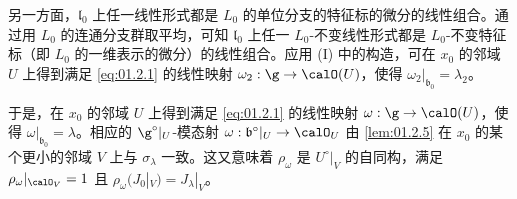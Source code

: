 另一方面，$\mathfrak{l}_0$ 上任一线性形式都是 $L_0$ 的单位分支的特征标的微分的线性组合。通过用 $L_0$ 的连通分支群取平均，可知 $\mathfrak{l}_0$ 上任一 $L_0$-不变线性形式都是 $L_0$-不变特征标（即 $L_0$ 的一维表示的微分）的线性组合。应用 (I) 中的构造，可在 $x_0$ 的邻域 $U$ 上得到满足 \eqref{eq:01.2.1} 的线性映射 $\omega_2:\g\to\calO(U)$，使得 $\omega_2|_{\mathfrak{b}_0}=\lambda_2$。

于是，在 $x_0$ 的邻域 $U$ 上得到满足 \eqref{eq:01.2.1} 的线性映射 $\omega:\g\to\calO(U)$，使得 $\omega|_{\mathfrak{b}_0}=\lambda$。相应的 $\g^\circ|_U$-模态射 $\omega:\mathfrak{b}^\circ|_U\to\calO_U$ 由 \ref{lem:01.2.5} 在 $x_0$ 的某个更小的邻域 $V$ 上与 $\sigma_\lambda$ 一致。这又意味着 $\rho_\omega$ 是 $U^\circ|_V$ 的自同构，满足 $\rho_\omega|_{\calO_V}=1$ 且 $\rho_\omega(J_0|_V)=J_\lambda|_V$。
